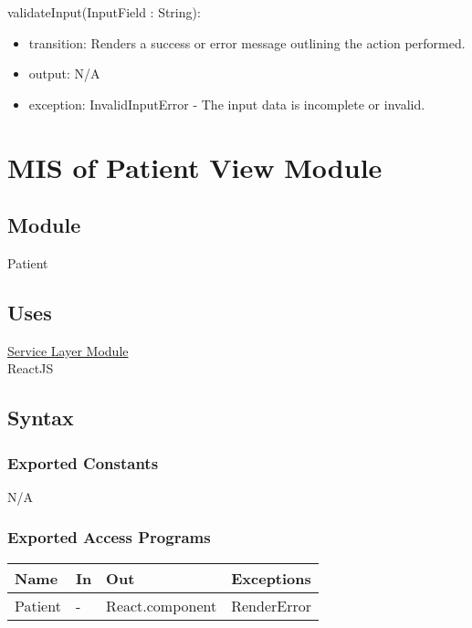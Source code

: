 \documentclass[12pt, titlepage]{article}
\begin{document}
\noindent validateInput(InputField : String):
\begin{itemize}
\item transition: Renders a success or error message outlining the action performed.
\item output: N/A
\item exception: InvalidInputError - The input data is incomplete or invalid.
\end{itemize}

\newpage

\section{MIS of Patient View Module} \label{Module_PatientView}

\subsection{Module}
Patient

\subsection{Uses}
\hyperref[Module_Service Layer]{Service Layer Module} \\
ReactJS\\

\subsection{Syntax}

\subsubsection{Exported Constants}
N/A

\subsubsection{Exported Access Programs}

\begin{center}
  \begin{tabular}{p{3cm} p{2cm} p{4cm} p{3cm}}
\hline
\textbf{Name} & \textbf{In} & \textbf{Out} & \textbf{Exceptions} \\
\hline
Patient & - & React.component & RenderError \\
\hline
\end{tabular}
\end{center}
\end{document}
